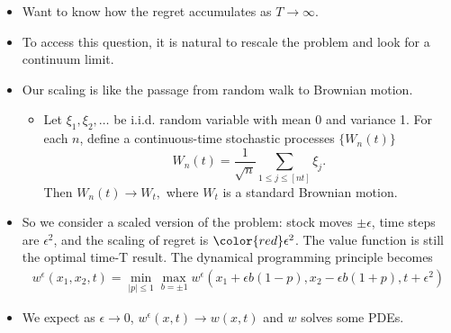 \documentclass{beamer}
\begin{document}
\begin{frame}
\begin{itemize}
\item Want to know how the regret accumulates as $T\to \infty$.
\pause
\item To access this question, it is natural to rescale the problem and look for a continuum limit.
\pause
\item Our scaling is like the passage from random walk to Brownian motion.
 \begin{itemize}
 \item Let $\xi_1,\xi_2,\ldots$ be i.i.d. random variable with mean 0 and variance 1. For each $n$, define a continuous-time stochastic processes $\{W_n(t)\}$
 $$W_n(t) = \frac{1}{\sqrt{n}}\sum_{1\le j\le [nt]}\xi_j.$$ 
Then $W_n(t)\to W_t,$ where $W_t$ is a standard Brownian motion.
\end{itemize}

\end{itemize}

\end{frame}

\begin{frame}
\begin{itemize}
\item So we consider a {\color{red}scaled} version of the problem: stock moves {\color{red}$\pm \epsilon$}, time steps are {\color{red}$ \epsilon^2$}, and the scaling of regret is ${\color{red}\epsilon^2}$. The value function is still the optimal time-T result.  The dynamical programming principle becomes
\begin{align*}
w^\epsilon(x_1,x_2,t) = \min_{|p|\le 1}\max_{b = \pm 1} w^\epsilon(x_1 + \epsilon b(1-p),x_2-\epsilon b(1+p),t+\epsilon^2)
\end{align*}
\pause
\item We expect as $\epsilon\to 0$, $w^\epsilon(x,t)\to w(x,t)$ and $w$ solves some PDEs.
\end{itemize}

\end{frame}
\end{document}
